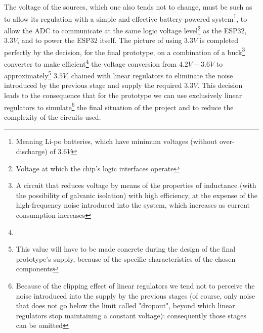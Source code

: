 \documentclass[a4paper, 10pt, final]{article} %
\begin{document}
    The voltage of the sources, which one also tends not to change, must be such as to allow its regulation with a simple and effective battery-powered system\footnote{Meaning Li-po batteries, which have minimum voltages (without over-discharge) of $3.6V$}, to allow the ADC to communicate at the same logic voltage level\footnote{Voltage at which the chip's logic interfaces operate} as the ESP32, $3.3V$, and to power the ESP32 itself.
    The picture of using $3.3V$ is completed perfectly by the decision, for the final prototype, on a combination of a buck\footnote{A circuit that reduces voltage by means of the properties of inductance (with the possibility of galvanic isolation) with high efficiency, at the expense of the high-frequency noise introduced into the system, which increases as current consumption increases} converter to make efficient\footnote{} the voltage conversion from $4.2V-3.6V$ to approximately\footnote{This value will have to be made concrete during the design of the final prototype's supply, because of the specific characteristics of the chosen components} $3.5V$, chained with linear regulators to eliminate the noise introduced by the previous stage and supply the required $3.3V$.
    This decision leads to the consequence that for the prototype we can use exclusively linear regulators to simulate\footnote{Because of the clipping effect of linear regulators we tend not to perceive the noise introduced into the supply by the previous stages (of course, only noise that does not go below the limit called "dropout", beyond which linear regulators stop maintaining a constant voltage): consequently those stages can be omitted} the final situation of the project and to reduce the complexity of the circuits used.
\end{document}
